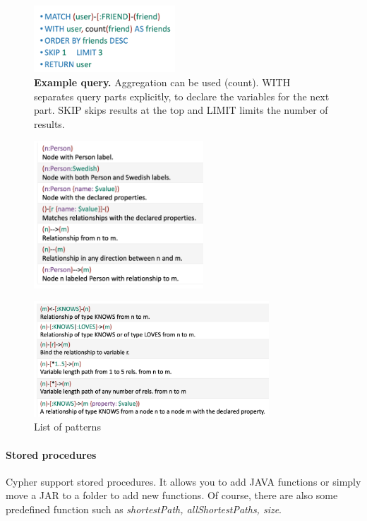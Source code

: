 \documentclass[10pt,a4paper]{article}
\begin{document}
\begin{figure}[h!]
 \hfill \includegraphics[width=150pt]{images/cypher-ex-query.png}\hspace*{\fill}
 \caption{\textbf{Example query.} Aggregation can be used (count). WITH separates query parts explicitly, to declare the variables for the next part. SKIP skips results at the top and LIMIT limits the number of results. }
\end{figure}
\begin{figure}[h!]
 \hfill \includegraphics[width=180pt]{images/cypher-ex-pattern1.png}\hspace*{\fill}
\end{figure}
\begin{figure}[h!]
 \hfill \includegraphics[width=250pt]{images/cypher-ex-pattern2.png}\hspace*{\fill}
   \caption{List of patterns}
\end{figure}
\paragraph{Stored procedures}
Cypher support stored procedures. It allows you to add JAVA functions or simply move a JAR to a folder to add new functions. Of course, there are also some predefined function such as \textit{shortestPath, allShortestPaths, size}.
\end{document}
